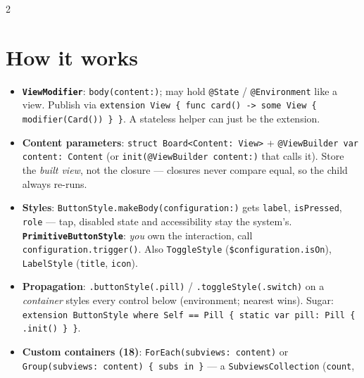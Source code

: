 \documentclass[8pt]{extarticle}
\newcommand\arr{\texttt{\hbox{-}\hbox{>}}}
\newcommand\eqeq{\texttt{\hbox{=}\hbox{=}}}
\begin{document}


\begin{multicols}{2}
\raggedright

\section{How it works}
\begin{itemize}
  \item \textbf{\texttt{ViewModifier}}: \texttt{body(content:)}; may hold \texttt{@State} /
        \texttt{@Environment} like a view. Publish via \texttt{extension View \{ func card() \arr\ some View
        \{ modifier(Card()) \} \}}. A stateless helper can just be the extension.
  \item \textbf{Content parameters}: \texttt{struct Board<Content: View>} + \texttt{@ViewBuilder var
        content: Content} (or \texttt{init(@ViewBuilder content:)} that calls it). Store the \emph{built view},
        not the closure — closures never compare equal, so the child always re-runs.
  \item \textbf{Styles}: \texttt{ButtonStyle.makeBody(configuration:)} gets \texttt{label},
        \texttt{isPressed}, \texttt{role} — tap, disabled state and accessibility stay the system's.
        \textbf{\texttt{PrimitiveButtonStyle}}: \emph{you} own the interaction, call
        \texttt{configuration.trigger()}. Also \texttt{ToggleStyle} (\texttt{\$configuration.isOn}),
        \texttt{LabelStyle} (\texttt{title}, \texttt{icon}).
  \item \textbf{Propagation}: \texttt{.buttonStyle(.pill)} / \texttt{.toggleStyle(.switch)} on a
        \emph{container} styles every control below (environment; nearest wins). Sugar:
        \texttt{extension ButtonStyle where Self \eqeq\ Pill \{ static var pill: Pill \{ .init() \} \}}.
  \item \textbf{Custom containers (18)}: \texttt{ForEach(subviews: content)} or
        \texttt{Group(subviews: content) \{ subs in \}} — a \texttt{SubviewsCollection} (\texttt{count},

\end{itemize}
\end{multicols}
\end{document}

